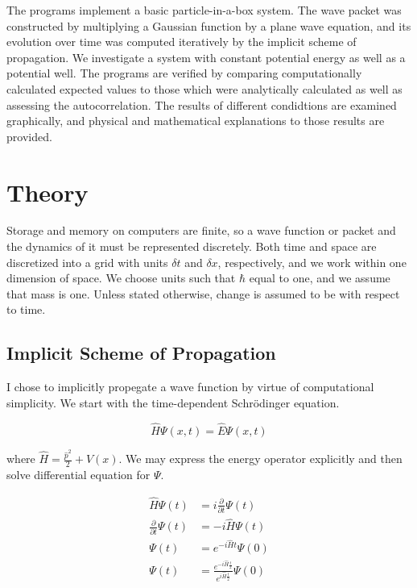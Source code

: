 \documentclass[letterpaper,12pt]{article}
\begin{document}
    The programs implement a basic particle-in-a-box system. The wave packet
    was
    constructed by multiplying a Gaussian function by a plane wave equation, and
    its evolution over time was computed iteratively by the implicit scheme of
    propagation. We investigate a
    system with constant potential energy as well as a potential well. The
    programs are verified by comparing computationally calculated expected values to
    those which were
    analytically calculated as well as assessing the autocorrelation. The results of different
    condidtions are examined graphically, and physical and
    mathematical explanations to those results are provided.

    \newpage

    \section*{Theory}

    Storage and memory on computers are finite, so a wave function or packet and
    the dynamics of it must be represented discretely. Both time and space are
    discretized into a grid with units $\delta t$ and $\delta x$, respectively,
    and we work within one dimension of space. We choose units such that $\hbar$
    equal to one, and we assume that mass is one. Unless stated otherwise,
    change is assumed to be with respect to time.

    \subsection*{Implicit Scheme of Propagation}

    I chose to implicitly propegate a wave function by virtue of computational
    simplicity. We start with the time-dependent Schrödinger equation.

    \[
        \hat{H} \Psi(x, t) = \hat{E} \Psi(x, t)
    \]

    where $\hat{H} = \frac{\hat{p} ^ 2}{2} + V(x)$. We may express the energy
    operator explicitly and then solve differential equation for $\Psi$.

    \begin{align*}
        \hat{H} \Psi(t)
        &= i\frac{\partial}{\partial t} \Psi(t) \\
        \frac{\partial}{\partial t} \Psi(t)
        &= -i\hat{H} \Psi(t) \\
        \Psi(t) &= e^{-i\hat{H} t} \Psi(0) \\
        \Psi(t) &=
        \frac{e^{-i\hat{H} \frac{t}{2}}}{e^{i\hat{H} \frac{t}{2}}} \Psi(0)
    \end{align*}
\end{document}
